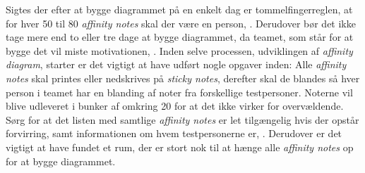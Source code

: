 Sigtes der efter at bygge diagrammet på en enkelt dag er tommelfingerreglen, at for hver 50 til 80 \textit{affinity notes} skal der være en person, \parencite[s. 163]{Book:BuildingAnAffinity}. Derudover bør det ikke tage mere end to eller tre dage at bygge diagrammet, da teamet, som står for at bygge det vil miste motivationen, \parencite[s. 163]{Book:BuildingAnAffinity}.\blankline
%
Inden selve processen, udviklingen af \textit{affinity diagram}, starter er det vigtigt at have udført nogle opgaver inden: Alle \textit{affinity notes} skal printes eller nedskrives på \textit{sticky notes}, derefter skal de blandes så hver person i teamet har en blanding af noter fra forskellige testpersoner. Noterne vil blive udleveret i bunker af omkring 20 for at det ikke virker for overvældende. Sørg for at det listen med samtlige \textit{affinity notes} er let tilgængelig hvis der opstår forvirring, samt informationen om hvem testpersonerne er, \parencite[ss. 163-164]{Book:BuildingAnAffinity}. Derudover er det vigtigt at have fundet et rum, der er stort nok til at hænge alle \textit{affinity notes} op for at bygge diagrammet. 

